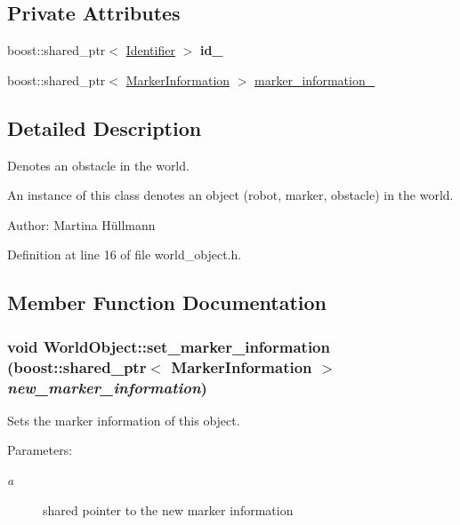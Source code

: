 \subsection*{Private Attributes}
\begin{CompactItemize}
\item 
\hypertarget{class_world_object_4f3fb32c00469db5b5ed9c4622f9ddcb}{
boost::shared\_\-ptr$<$ \hyperlink{class_identifier}{Identifier} $>$ \textbf{id\_\-}}
\label{class_world_object_4f3fb32c00469db5b5ed9c4622f9ddcb}

\item 
boost::shared\_\-ptr$<$ \hyperlink{class_marker_information}{MarkerInformation} $>$ \hyperlink{class_world_object_837a1b5d6014ae2265d8d6f9caf65754}{marker\_\-information\_\-}
\end{CompactItemize}


\subsection{Detailed Description}
Denotes an obstacle in the world. 

An instance of this class denotes an object (robot, marker, obstacle) in the world.

\begin{Desc}
\item[Author:]Martina Hüllmann \end{Desc}


Definition at line 16 of file world\_\-object.h.

\subsection{Member Function Documentation}
\hypertarget{class_world_object_a502586bf3c68894552f805cd6b99670}{
\subsubsection[set\_\-marker\_\-information]{\setlength{\rightskip}{0pt plus 5cm}void WorldObject::set\_\-marker\_\-information (boost::shared\_\-ptr$<$ {\bf MarkerInformation} $>$ {\em new\_\-marker\_\-information})}}
\label{class_world_object_a502586bf3c68894552f805cd6b99670}


Sets the marker information of this object. \begin{Desc}
\item[Parameters:]
\begin{description}
\item[{\em a}]shared pointer to the new marker information \end{description}
\end{Desc}


